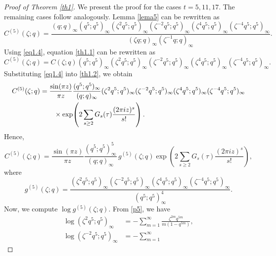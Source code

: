 \documentclass[12pt,oneside,reqno]{amsart}
\numberwithin{equation}{section}
\begin{document}
\begin{proof}[Proof of Theorem \ref{th1}] We present the proof for the cases $t=5,11,17$. The remaining cases follow analogously. Lemma \eqref{lema5} can be rewritten as
	\begin{equation}\label{th1.1}
		C^{(5)}(\zeta;q)
		=
		\frac{(q;q)_{\infty}
			(q^{5};q^{5})_{\infty}
			(\zeta^{2}q^{5};q^{5})_{\infty}
			(\zeta^{-2}q^{5};q^{5})_{\infty}
			(\zeta^{4}q^{5};q^{5})_{\infty}
			(\zeta^{-4}q^{5};q^{5})_{\infty}}
		{(\zeta q;q)_{\infty}
			(\zeta^{-1}q;q)_{\infty}}.
	\end{equation}
	Using \eqref{eq1.4}, equation \eqref{th1.1} can be rewritten as
	\begin{equation}\label{th1.2}
		C^{(5)}(\zeta;q)
		=
		C(\zeta;q)
		(q^{5};q^{5})_{\infty}
		(\zeta^{2}q^{5};q^{5})_{\infty}
		(\zeta^{-2}q^{5};q^{5})_{\infty}
		(\zeta^{4}q^{5};q^{5})_{\infty}
		(\zeta^{-4}q^{5};q^{5})_{\infty}.
	\end{equation}
	Substituting \ref{eq1.4} into \eqref{th1.2}, we obtain
	\begin{align}\label{th1.3}
		C^{(5)}(\zeta;q)
		&=
		\frac{\sin(\pi z)}{\pi z}
		\frac{(q^{5};q^{5})_{\infty}}
		{(q;q)_{\infty}}
		(\zeta^{2}q^{5};q^{5})_{\infty}
		(\zeta^{-2}q^{5};q^{5})_{\infty}
		(\zeta^{4}q^{5};q^{5})_{\infty}
		(\zeta^{-4}q^{5};q^{5})_{\infty}
		\notag\\
		&\qquad\times
		\exp\!\left(
		2\sum_{s\ge2}
		G_s(\tau)
		\frac{(2\pi iz)^s}{s!}
		\right).
	\end{align}
	Hence,
	\begin{equation}\label{th1.4}
		C^{(5)}(\zeta;q)
		=
		\frac{\sin(\pi z)}{\pi z}
		\frac{(q^{5};q^{5})^5_{\infty}}
		{(q;q)_{\infty}}
		\,g^{(5)}(\zeta;q)
		\exp\left(
		2\sum_{s\ge2}
		G_s(\tau)
		\frac{(2\pi iz)^s}{s!}
		\right),
	\end{equation}
	where
	\begin{equation}\label{th1.5}
		g^{(5)}(\zeta;q)
		=
		\frac{
			(\zeta^{2}q^{5};q^{5})_{\infty}
			(\zeta^{-2}q^{5};q^{5})_{\infty}
			(\zeta^{4}q^{5};q^{5})_{\infty}
			(\zeta^{-4}q^{5};q^{5})_{\infty}
		}{
			(q^{5};q^{5})_{\infty}^{4}
		}.
	\end{equation}
	Now, we compute $\log g^{(5)}(\zeta;q)$. From \eqref{p5}, we have
	\begin{align}
		\log (\zeta^{2}q^{5};q^{5})_{\infty}
		&=
		-\sum_{m=1}^{\infty}
		\frac{\zeta^{2m}q^{5m}}
		{m(1-q^{5m})},
		\label{eq11a}
		\\
		\log (\zeta^{-2}q^{5};q^{5})_{\infty}
		&=
		-\sum_{m=1}^{\infty}

\end{align}
\end{proof}
\end{document}
